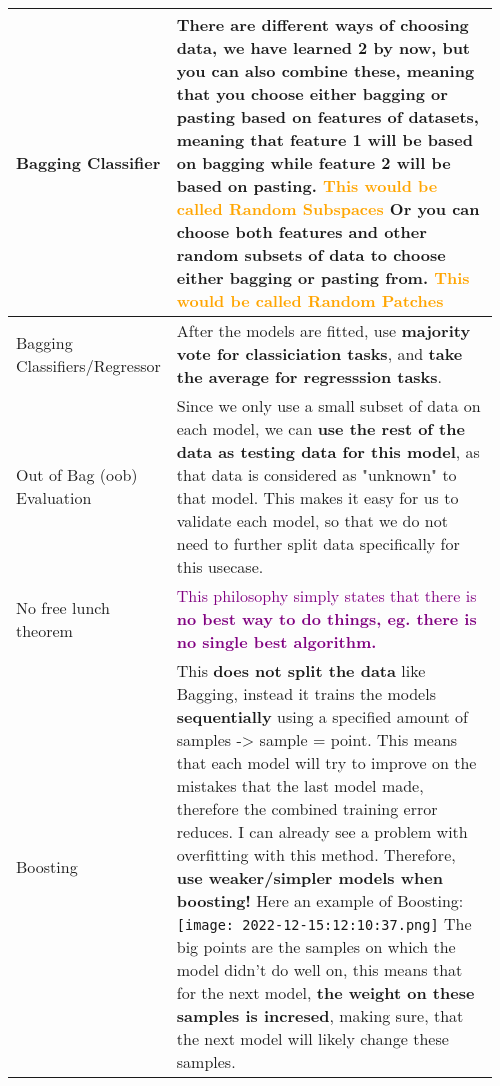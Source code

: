 \documentclass[main.tex,fontsize=8pt,paper=a4,paper=portrait,DIV=calc,]{scrartcl}
\begin{document}
\begin{table}[ht!]
\begin{tabular}{|m{0.2\linewidth}|m{0.755\linewidth}|}
\hline
Bagging Classifier & 
There are different ways of choosing data, we have learned 2 by now, but you can also combine these, meaning that you choose either bagging or pasting based on features of datasets, meaning that feature 1 will be based on bagging while feature 2 will be based on pasting. \newline
\textcolor{orange}{This would be called \textbf{Random Subspaces}}\newline
Or you can choose both features and other random subsets of data to choose either bagging or pasting from.\newline
\textcolor{orange}{This would be called \textbf{Random Patches}}
\\
\hline
Bagging Classifiers/Regressor & 
After the models are fitted, use \textbf{majority vote for classiciation tasks}, and \textbf{take the average for regresssion tasks}.\\
\hline
Out of Bag (oob) Evaluation & 
Since we only use a small subset of data on each model, we can \textbf{use the rest of the data as testing data for this model}, as that data is considered as "unknown" to that model.\newline
This makes it easy for us to validate each model, so that we do not need to further split data specifically for this usecase.\\
\hline
No free lunch theorem & 
\textcolor{purple}{This philosophy simply states that there is \textbf{no best way to do things, eg. there is no single best algorithm.}}\\
\hline
Boosting & 
This \textbf{does not split the data} like Bagging, instead it trains the models \textbf{sequentially} using a specified amount of samples -> sample = point. \newline
This means that each model will try to improve on the mistakes that the last model made, therefore the combined training error reduces.\newline
I can already see a problem with overfitting with this method. Therefore, \textbf{use weaker/simpler models when boosting!}\newline
Here an example of Boosting: \newline
\texttt{[image: 2022-12-15:12:10:37.png]}\newline
The big points are the samples on which the model didn't do well on, this means that for the next model, \textbf{the weight on these samples is incresed}, making sure, that the next model will likely change these samples.\newline

\end{tabular}
\end{table}
\end{document}
